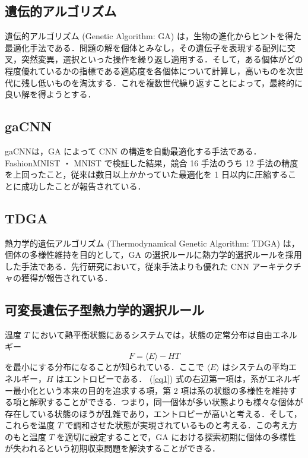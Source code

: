 \documentclass[twocolumn]{jarticle}     %
\begin{document}
\subsection{遺伝的アルゴリズム}
遺伝的アルゴリズム (Genetic Algorithm: GA) は，生物の進化からヒントを得た最適化手法である．問題の解を個体とみなし，その遺伝子を表現する配列に交叉，突然変異，選択といった操作を繰り返し適用する．そして，ある個体がどの程度優れているかの指標である適応度を各個体について計算し，高いものを次世代に残し低いものを淘汰する．これを複数世代繰り返すことによって，最終的に良い解を得ようとする．%

\subsection{gaCNN}
gaCNNは，GA によって CNN の構造を自動最適化する手法である．FashionMNIST ・ MNIST で検証した結果，競合 16 手法のうち 12 手法の精度を上回ったこと，従来は数日以上かかっていた最適化を 1 日以内に圧縮することに成功したことが報告されている． \par

\subsection{TDGA}
熱力学的遺伝アルゴリズム (Thermodynamical Genetic Algorithm: TDGA) は，個体の多様性維持を目的として，GA の選択ルールに熱力学的選択ルールを採用した手法である．先行研究において，従来手法よりも優れた CNN アーキテクチャの獲得が報告されている．

\subsection{可変長遺伝子型熱力学的選択ルール}
温度 $T$ において熱平衡状態にあるシステムでは，状態の定常分布は自由エネルギー
\begin{equation}
    F = \langle E \rangle- HT
    \label{eq1}
\end{equation}
を最小にする分布になることが知られている．ここで $\langle E \rangle$ はシステムの平均エネルギー，$H$ はエントロピーである． (\ref{eq1}) 式の右辺第一項は，系がエネルギー最小化という本来の目的を追求する項，第 2 項は系の状態の多様性を維持する項と解釈することができる．つまり，同一個体が多い状態よりも様々な個体が存在している状態のほうが乱雑であり，エントロピーが高いと考える．そして，これらを温度 $T$ で調和させた状態が実現されているものと考える．この考え方のもと温度 $T$ を適切に設定することで，GA における探索初期に個体の多様性が失われるという初期収束問題を解決することができる．\par
\end{document}
